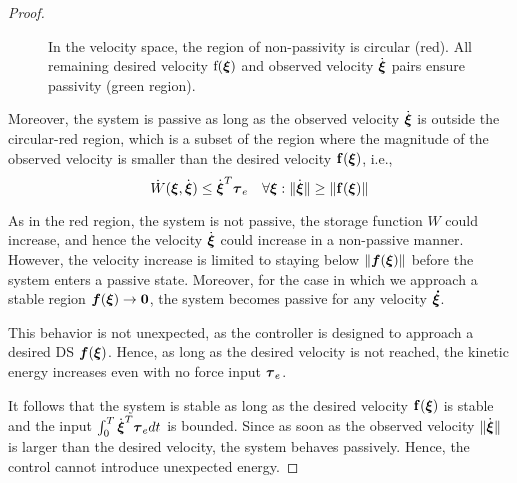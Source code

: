 \begin{proof}
\begin{figure}[b]
	\centering
      
	\caption{In the velocity space, the region of non-passivity is circular (red). All remaining desired velocity $\mathrm f(\mathrm{{\boldsymbol{\xi}}})$ and observed velocity $\dot{\mathrm {\boldsymbol{\xi}}}$ pairs ensure passivity (green region).}
	\label{fig:passivity_analysis}
\end{figure}

Moreover, the system is passive as long as the observed velocity $\dot{{\boldsymbol{\xi}}}$ is outside the circular-red region, which is a subset of the region where the magnitude of the observed velocity is smaller than the desired velocity $\mathbf{f}({\boldsymbol{\xi}})$, i.e.,
\begin{equation}
	\dot W({\boldsymbol{\xi}}, \dot{{\boldsymbol{\xi}}}) \leq \dot{{\boldsymbol{\xi}}}^T \boldsymbol{\tau}_e
 \quad \forall {\boldsymbol{\xi}} : \| \dot{{\boldsymbol{\xi}}} \| \geq\| \mathbf{f}({\boldsymbol{\xi}}) \| 
\end{equation}

As in the red region, the system is not passive, the storage function $W$ could increase, and hence the velocity $\dot {\boldsymbol{\xi}}$ could increase in a non-passive manner. However, the velocity increase is limited to staying below $\| \boldsymbol{f}({\boldsymbol{\xi}}) \|$ before the system enters a passive state. Moreover, for the case in which we approach a stable region $\boldsymbol{f}({\boldsymbol{\xi}}) \rightarrow \boldsymbol{0}$, the system becomes passive for any velocity $\boldsymbol{\boldsymbol{\dot \xi}}$.

This behavior is not unexpected, as the controller is designed to approach a desired DS $\boldsymbol{f}({\boldsymbol{\xi}})$. Hence, as long as the desired velocity is not reached, the kinetic energy increases even with no force input $\boldsymbol{\tau}_e$.

It follows that the system is stable as long as the desired velocity $\mathbf{f}({\boldsymbol{\xi}})$ is stable and the input $\int_{0}^T \dot{{\boldsymbol{\xi}}}^T \boldsymbol{\tau}_e dt$ is bounded. Since as soon as the observed velocity $\| \dot{{\boldsymbol{\xi}}} \| $ is larger than the desired velocity, the system behaves passively. Hence, the control cannot introduce unexpected energy.


\end{proof}
